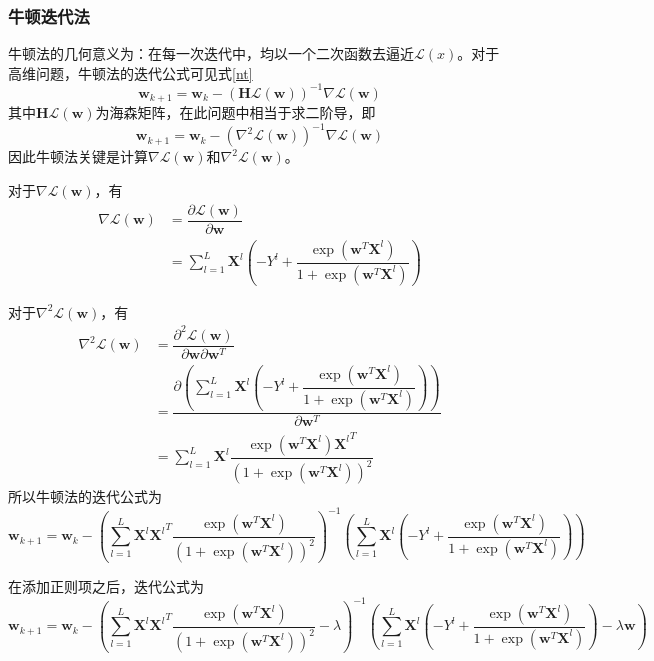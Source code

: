 \subsubsection{牛顿迭代法}

牛顿法的几何意义为：在每一次迭代中，均以一个二次函数去逼近$\mathcal{L}(x)$。对于高维问题，牛顿法的迭代公式可见式\ref{nt}
\begin{equation}
    \label{nt}
    \mathbf{w}_{k+1}=\mathbf{w}_k-\left(\mathbf{H}\mathcal{L}(\mathbf{w})\right)^{-1}\nabla \mathcal{L}(\mathbf{w})
\end{equation}
其中$\mathbf{H}\mathcal{L}(\mathbf{w})$为海森矩阵，在此问题中相当于求二阶导，即
\begin{equation}
    \mathbf{w}_{k+1}=\mathbf{w}_k-\left(\nabla^2\mathcal{L}(\mathbf{w})\right)^{-1}\nabla \mathcal{L}(\mathbf{w})
\end{equation}
因此牛顿法关键是计算$\nabla \mathcal{L}(\mathbf{w})$和$\nabla^2\mathcal{L}(\mathbf{w})$。

对于$\nabla \mathcal{L}(\mathbf{w})$，有
\begin{align}
    \nabla\mathcal{L}(\mathbf{w})
    &= \dfrac{\partial\mathcal{L}(\mathbf{w})}{\partial\mathbf{w}} \\
    &= \sum^L_{l=1}\mathbf{X}^l\left(-Y^l+\dfrac{\exp\left(\mathbf{w}^T\mathbf{X}^l\right)}{1+\exp\left(\mathbf{w}^T\mathbf{X}^l\right)}\right)
\end{align}

对于$\nabla^2\mathcal{L}(\mathbf{w})$，有
\begin{align}
    \nabla^2\mathcal{L}(\mathbf{w})
    &= \dfrac{\partial^2\mathcal{L}(\mathbf{w})}{\partial\mathbf{w}\partial\mathbf{w}^T} \\
    &= \dfrac{\partial\left(\sum\limits^L_{l=1}\mathbf{X}^l\left(-Y^l+\dfrac{\exp\left(\mathbf{w}^T\mathbf{X}^l\right)}{1+\exp\left(\mathbf{w}^T\mathbf{X}^l\right)}\right)\right)}{\partial\mathbf{w}^T} \\
    &= \sum^L_{l=1}\mathbf{X}^l\dfrac{\exp\left(\mathbf{w}^T\mathbf{X}^l\right){\mathbf{X}^l}^T}{\left(1+\exp\left(\mathbf{w}^T\mathbf{X}^l\right)\right)^2}
\end{align}
所以牛顿法的迭代公式为
\begin{equation}
    \mathbf{w}_{k+1}=\mathbf{w}_k-\left(\sum^L_{l=1}\mathbf{X}^l{\mathbf{X}^l}^T\dfrac{\exp\left(\mathbf{w}^T\mathbf{X}^l\right)}{\left(1+\exp\left(\mathbf{w}^T\mathbf{X}^l\right)\right)^2}\right)^{-1}\left(\sum^L_{l=1}\mathbf{X}^l\left(-Y^l+\dfrac{\exp\left(\mathbf{w}^T\mathbf{X}^l\right)}{1+\exp\left(\mathbf{w}^T\mathbf{X}^l\right)}\right)\right)
\end{equation}

在添加正则项之后，迭代公式为
\begin{equation}
    \mathbf{w}_{k+1}=\mathbf{w}_k-\left(\sum^L_{l=1}\mathbf{X}^l{\mathbf{X}^l}^T\dfrac{\exp\left(\mathbf{w}^T\mathbf{X}^l\right)}{\left(1+\exp\left(\mathbf{w}^T\mathbf{X}^l\right)\right)^2}-\lambda\right)^{-1}\left(\sum^L_{l=1}\mathbf{X}^l\left(-Y^l+\dfrac{\exp\left(\mathbf{w}^T\mathbf{X}^l\right)}{1+\exp\left(\mathbf{w}^T\mathbf{X}^l\right)}\right)-\lambda\mathbf{w}\right)
\end{equation}
